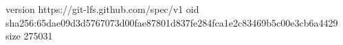 version https://git-lfs.github.com/spec/v1
oid sha256:65dae09d3d5767073d00fae87801d837fe284fca1e2c83469b5c00e3cb6a4429
size 275031
